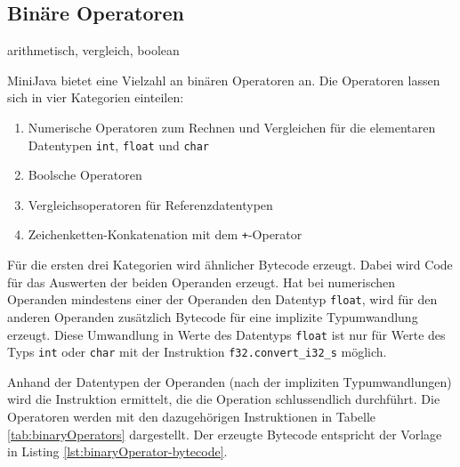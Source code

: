 

\subsection{Binäre Operatoren}
arithmetisch, vergleich, boolean

MiniJava bietet eine Vielzahl an binären Operatoren an. Die Operatoren lassen sich in vier Kategorien einteilen:
\begin{enumerate}
    \item Numerische Operatoren zum Rechnen und Vergleichen für die elementaren Datentypen \lstinline{int}, \lstinline{float} und \lstinline{char}
    \item Boolsche Operatoren
    \item Vergleichsoperatoren für Referenzdatentypen
    \item Zeichenketten-Konkatenation mit dem \lstinline{+}-Operator
\end{enumerate}

Für die ersten drei Kategorien wird ähnlicher Bytecode erzeugt. Dabei wird Code für das Auswerten der beiden Operanden erzeugt. Hat bei numerischen Operanden mindestens einer der Operanden den Datentyp \lstinline{float}, wird für den anderen Operanden zusätzlich Bytecode für eine implizite Typumwandlung erzeugt. Diese Umwandlung in Werte des Datentyps \lstinline{float} ist nur für Werte des Typs \lstinline{int} oder \lstinline{char} mit der Instruktion \lstinline{f32.convert_i32_s} möglich.

Anhand der Datentypen der Operanden (nach der impliziten Typumwandlungen) wird die Instruktion ermittelt, die die Operation schlussendlich durchführt. Die Operatoren werden mit den dazugehörigen Instruktionen in Tabelle \ref{tab:binaryOperators} dargestellt. Der erzeugte Bytecode entspricht der Vorlage in Listing \ref{lst:binaryOperator-bytecode}.


